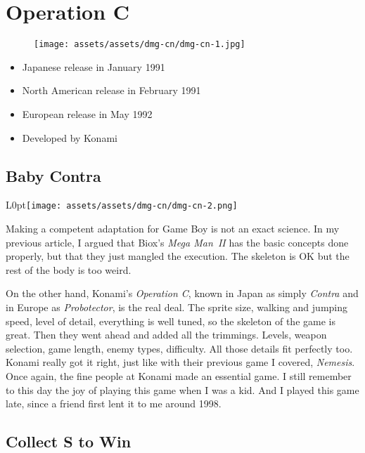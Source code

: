 \documentclass{book}
\begin{document}
\chapter*{Operation C}
\vspace{\baselineskip}\begin{figure}[H]{\texttt{[image: assets/assets/dmg-cn/dmg-cn-1.jpg]}}\end{figure}\vspace{\baselineskip}
\begin{itemize}[left=0pt, nosep]
\item Japanese release in January 1991
\item North American release in February 1991
\item European release in May 1992
\item Developed by Konami

\end{itemize}
\newpage\FloatBarrier\section*{Baby Contra}
\begin{wrapfigure}{L}{0pt}{\texttt{[image: assets/assets/dmg-cn/dmg-cn-2.png]}}\end{wrapfigure}\noindent
Making a competent adaptation for Game Boy is not an exact science. In my previous article, I argued that Biox’s \emph{Mega Man~II} has the basic concepts done properly, but that they just mangled the execution. The skeleton is OK but the rest of the body is too weird.\par
On the other hand, Konami’s \emph{Operation C}, known in Japan as simply \emph{Contra} and in Europe as \emph{Probotector}, is the real deal. The sprite size, walking and jumping speed, level of detail, everything is well tuned, so the skeleton of the game is great. Then they went ahead and added all the trimmings. Levels, weapon selection, game length, enemy types, difficulty. All those details fit perfectly too. Konami really got it right, just like with their previous game I covered, \emph{Nemesis}. Once again, the fine people at Konami made an essential game. I still remember to this day the joy of playing this game when I was a kid. And I played this game late, since a friend first lent it to me around 1998.\par
\FloatBarrier\section*{Collect S to Win}
\end{document}
